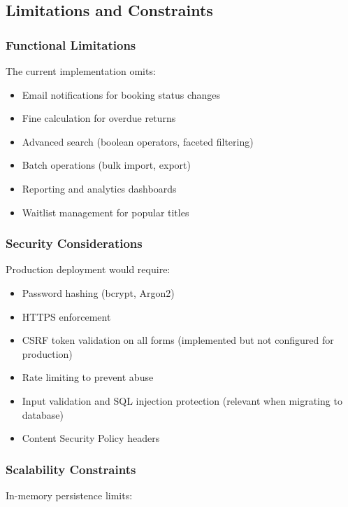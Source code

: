 \documentclass[12pt,a4paper]{article}
\begin{document}
\subsection{Limitations and Constraints}

\subsubsection{Functional Limitations}

The current implementation omits:

\begin{itemize}[leftmargin=*]
    \item Email notifications for booking status changes
    \item Fine calculation for overdue returns
    \item Advanced search (boolean operators, faceted filtering)
    \item Batch operations (bulk import, export)
    \item Reporting and analytics dashboards
    \item Waitlist management for popular titles
\end{itemize}

\subsubsection{Security Considerations}

Production deployment would require:

\begin{itemize}[leftmargin=*]
    \item Password hashing (bcrypt, Argon2)
    \item HTTPS enforcement
    \item CSRF token validation on all forms (implemented but not configured for production)
    \item Rate limiting to prevent abuse
    \item Input validation and SQL injection protection (relevant when migrating to database)
    \item Content Security Policy headers
\end{itemize}

\subsubsection{Scalability Constraints}

In-memory persistence limits:
\end{document}
